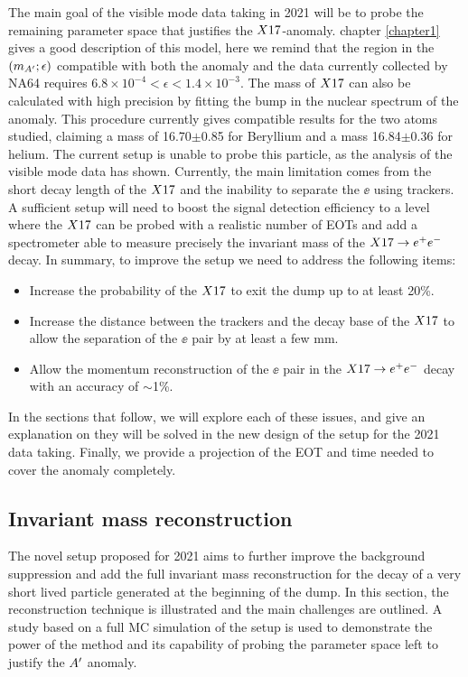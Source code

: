 The main goal of the visible mode data taking in 2021 will be to probe the remaining parameter space that justifies the $X17$-anomaly. chapter \ref{chapter1} gives a good description of this model, here we remind that the region in the $(m_{A'};\epsilon)$ compatible with both the anomaly and the data currently collected by NA64 requires $6.8 \times 10^{-4} < \epsilon < 1.4 \times 10^{-3}$. The mass of $X17$ can also be calculated with high precision by fitting the bump in the nuclear spectrum of the anomaly. This procedure currently gives compatible results for the two atoms studied, claiming a mass of 16.70$\pm$0.85 \mev for Beryllium and a mass 16.84$\pm$0.36 \mev for helium. The current setup is unable to probe this particle, as the analysis of the visible mode data has shown. Currently, the main limitation comes from the short decay length of the $X17$ and the inability to separate the $\ee$ using trackers. A sufficient setup will need to boost the signal detection efficiency to a level where the $X17$ can be probed with a realistic number of EOTs and add a spectrometer able to measure precisely the invariant mass of the $X17 \rightarrow e^+ e^-$ decay. In summary, to improve the setup we need to address the following items:

\begin{itemize}
\item Increase the probability of the $X17$ to exit the dump up to at least 20\%.
\item Increase the distance between the trackers and the decay base of the $X17$ to allow the separation of the $\ee$ pair by at least a few mm.
\item Allow the momentum reconstruction of the $\ee$ pair in the $X17 \rightarrow e^+ e^-$ decay with an accuracy of $\sim$1\%.
\end{itemize}

In the sections that follow, we will explore each of these issues, and give an explanation on they will be solved in the new design of the setup for the 2021 data taking.  Finally, we provide a projection of the EOT and time needed to cover the anomaly completely.

\subsection{Invariant mass reconstruction}
\label{ch5:sec:new-vismode-setup-invmass}

The novel setup proposed for 2021 aims to further improve the background suppression and add the full invariant mass reconstruction for the decay of a very short lived particle generated at the beginning of the dump. In this section, the reconstruction technique is illustrated and the main challenges are outlined. A study based on a full MC simulation of the setup is used to demonstrate the power of the method and its capability of probing the parameter space left to justify the $A'$ anomaly.


